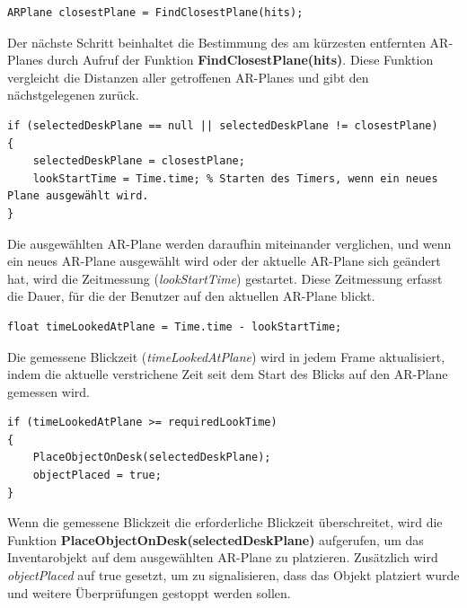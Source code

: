 \begin{lstlisting}[style=csharp, caption={Kürzest entfernte Plane}, label=code:FindClosestPlane]
ARPlane closestPlane = FindClosestPlane(hits);
\end{lstlisting}
Der nächste Schritt beinhaltet die Bestimmung des am kürzesten entfernten AR-Planes durch Aufruf der Funktion
\textbf{FindClosestPlane(hits)}. Diese Funktion vergleicht die Distanzen aller getroffenen AR-Planes und gibt den
nächstgelegenen zurück.\\

\begin{lstlisting}[style=csharp, caption={Plane auswählen und timer starten}, label=code:TimeMeasurement]
if (selectedDeskPlane == null || selectedDeskPlane != closestPlane)
{
    selectedDeskPlane = closestPlane;
    lookStartTime = Time.time; % Starten des Timers, wenn ein neues Plane ausgewählt wird.
}
\end{lstlisting}
Die ausgewählten AR-Plane werden daraufhin miteinander verglichen, und wenn ein neues AR-Plane ausgewählt wird oder der
aktuelle AR-Plane sich geändert hat, wird die Zeitmessung (\textit{lookStartTime}) gestartet. Diese Zeitmessung erfasst
die Dauer, für die der Benutzer auf den aktuellen AR-Plane blickt.\\

\begin{lstlisting}[style=csharp, caption={Blickzeit messen}, label=code:TimeUpdate]
float timeLookedAtPlane = Time.time - lookStartTime;
\end{lstlisting}
Die gemessene Blickzeit (\textit{timeLookedAtPlane}) wird in jedem Frame aktualisiert, indem die aktuelle verstrichene
Zeit seit dem Start des Blicks auf den AR-Plane gemessen wird.\\

\begin{lstlisting}[style=csharp, caption={Platzier-Funktion aufrufen}, label=code:Placement]
if (timeLookedAtPlane >= requiredLookTime)
{
    PlaceObjectOnDesk(selectedDeskPlane);
    objectPlaced = true;
}
\end{lstlisting}
Wenn die gemessene Blickzeit die erforderliche Blickzeit überschreitet, wird die Funktion
\textbf{PlaceObjectOnDesk(selectedDeskPlane)} aufgerufen, um das Inventarobjekt auf dem ausgewählten AR-Plane zu
platzieren. Zusätzlich wird \textit{objectPlaced} auf true gesetzt, um zu signalisieren, dass das Objekt platziert
wurde und weitere Überprüfungen gestoppt werden sollen.\\

